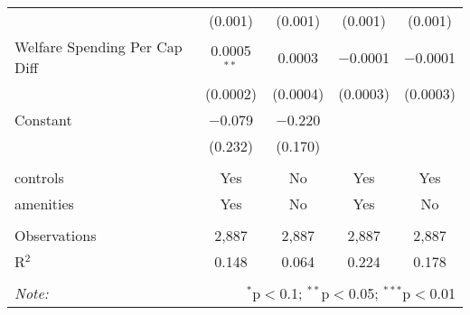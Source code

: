 \begin{table}[!htbp]
\begin{tabular}{@{\extracolsep{5pt}}lcccc}
  & (0.001) & (0.001) & (0.001) & (0.001) \\ 
  Welfare Spending Per Cap Diff & 0.0005$^{**}$ & 0.0003 & $-$0.0001 & $-$0.0001 \\ 
  & (0.0002) & (0.0004) & (0.0003) & (0.0003) \\ 
  Constant & $-$0.079 & $-$0.220 &  &  \\ 
  & (0.232) & (0.170) &  &  \\ 
 \hline \\[-1.8ex] 
controls & Yes & No & Yes & Yes \\ 
amenities & Yes & No & Yes & No \\ 
\hline \\[-1.8ex] 
Observations & 2,887 & 2,887 & 2,887 & 2,887 \\ 
R$^{2}$ & 0.148 & 0.064 & 0.224 & 0.178 \\ 
\hline 
\hline \\[-1.8ex] 
\textit{Note:}  & \multicolumn{4}{r}{$^{*}$p$<$0.1; $^{**}$p$<$0.05; $^{***}$p$<$0.01} \\ 
\end{tabular} 
\end{table} 
